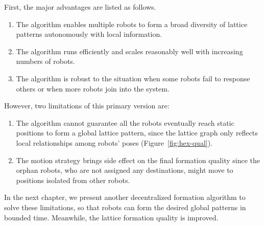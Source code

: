 First, the major advantages are listed as follows.
\begin{enumerate}
\item The algorithm enables multiple robots to form a broad diversity of lattice patterns autonomously with local information.
\item The algorithm runs efficiently and scales reasonably well with increasing numbers of robots.
\item The algorithm is robust to the situation when some robots fail to response others or when more robots join into the system.
\end{enumerate}


However, two limitations of this primary version are:
\begin{enumerate}
\item The algorithm cannot guarantee all the robots eventually reach static positions to form a global lattice pattern, since the lattice graph only reflects local relationships among robots' poses (Figure~\ref{fig:hex-qual}).
\item The motion strategy brings side effect on the final formation quality since the orphan robots, who are not assigned any destinations, might move to positions isolated from other robots.
\end{enumerate}

In the next chapter, we present another decentralized formation algorithm to solve these limitations, so that robots can form the desired global patterns in bounded time. 
Meanwhile, the lattice formation quality is improved.